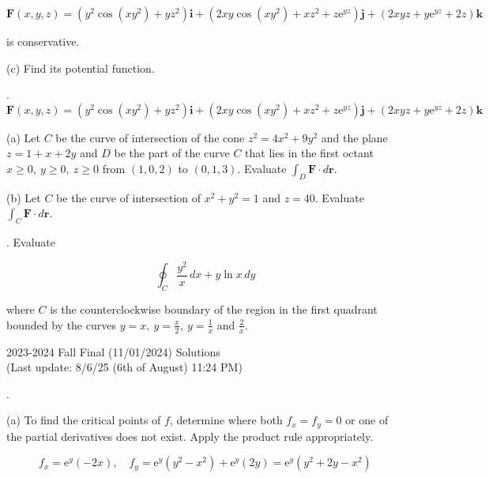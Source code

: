 \documentclass{article}
\begin{document}
\[\mathbf{F}(x,y,z)=\left(y^2\cos\left(xy^2\right)+yz^2\right)\mathbf{i}+\left(2xy\cos\left(xy^2\right)+xz^2+z\mathrm{e}^{yz}\right)\mathbf{j}+\left(2xyz+y\mathrm{e}^{yz}+2z\right)\mathbf{k}\]

\hfill

\noindent is conservative.

\hfill

\noindent (c) Find its potential function.

\newpage

. $\mathbf{F}(x,y,z)=\left(y^2\cos\left(xy^2\right)+yz^2\right)\mathbf{i}+\left(2xy\cos\left(xy^2\right)+xz^2+z\mathrm{e}^{yz}\right)\mathbf{j}+\left(2xyz+y\mathrm{e}^{yz}+2z\right)\mathbf{k}$

\hfill

\noindent (a) Let $C $ be the curve of intersection of the cone $z^2=4x^2+9y^2$ and the plane $z=1+x+2y$ and $D$ be the part of the curve $C$ that lies in the first octant $x\geq0,\:y\geq0,\:z\geq0$ from $(1,0,2)$ to $(0,1,3)$. Evaluate $\int_D\mathbf{F}\cdot d\mathbf{r}$.

\hfill

\noindent (b) Let $C$ be the curve of intersection of $x^2+y^2=1$ and $z=40$. Evaluate $\int_C\mathbf{F}\cdot d\mathbf{r}$.

\hfill

. Evaluate

\[\oint_C\frac{y^2}x\,dx+y\ln x\,dy\]

\hfill

\noindent where $C$ is the counterclockwise boundary of the region in the first quadrant bounded by the curves $\displaystyle y=x,\:y=\frac x2,\:y=\frac1x$ and $\displaystyle\frac2x$.

\newpage

\begin{center}
2023-2024 Fall Final (11/01/2024) Solutions\\
(Last update: 8/6/25 (6th of August) 11:24 PM)
\end{center}

.

\hfill

\noindent (a) To find the critical points of $f$, determine where both $f_x=f_y=0$ or one of the partial derivatives does not exist. Apply the product rule appropriately.

\[f_x=\mathrm{e}^y(-2x),\quad f_y=\mathrm{e}^y\left(y^2-x^2\right)+\mathrm{e}^y(2y)=\mathrm{e}^y\left(y^2+2y-x^2\right)\]
\end{document}

